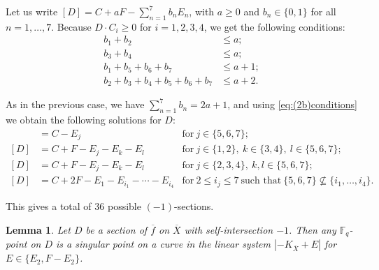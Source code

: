 \documentclass[a4paper, 11pt, reqno]{amsart}
\numberwithin{equation}{section} \numberwithin{figure}{section}
\def \F {{\mathbb F}}
\newtheorem{lemma}{Lemma}
\theoremstyle{definition}
\numberwithin{lemma}{section}
\begin{document}
Let us write $[D] = C + a F - \sum_{n=1}^7 b_n E_n$, with $a \geq 0$ and $b_n \in \{0, 1\}$ for all $n = 1, \ldots, 7$. Because $D \cdot C_i \geq 0$ for $i = 1, 2, 3, 4$, we get the following conditions:
\begin{align}
    b_1 + b_2 &\leq a;\nonumber\\
    b_3 + b_4 &\leq a;\nonumber\\
    b_1 + b_5 + b_6 + b_7 &\leq a+1;\nonumber\\
    b_2 + b_3 + b_4 + b_5 + b_6 + b_7 &\leq a+2.\label{eq:(2b)conditions}
\end{align}

As in the previous case, we have $\sum_{n=1}^7 b_n = 2a + 1$, and using \eqref{eq:(2b)conditions} we obtain the following solutions for $D$:
\begin{align}
    [D] &= C - E_j &\text{for} \ j \in \{5, 6, 7\};\nonumber\\
    [D] &= C + F - E_j - E_k - E_l &\text{for} \ j \in \{1, 2\}, \ k \in \{3, 4\}, \ l \in \{5, 6, 7\};\nonumber\\
    [D] &= C + F -  E_{j} - E_{k} - E_l &\text{for} \ j \in \{2, 3, 4\},\ k, l \in \{5, 6, 7\};\nonumber\\
    [D] &= C + 2F - E_1 - E_{i_1} - \cdots - E_{i_4} &\text{for} \ 2 \leq i_j \leq 7 \ \text{such that} \ \{5, 6, 7\} \not\subseteq  \{i_1, \ldots, i_4\}.\label{eq:(3)-1sections}
\end{align}

This gives a total of 36 possible $(-1)$-sections.

\begin{lemma}\label{lem:(2b)rationalpoints-1curves}
    Let $D$ be a section of $\overline{f}$ on $\overline{X}$ with self-intersection $-1$. Then any $\F_q$-point on $D$ is a singular point on a curve in the linear system $|-K_{\overline{X}} + E|$ for $E \in \{E_2, F - E_2\}$.
\end{lemma}
\end{document}
